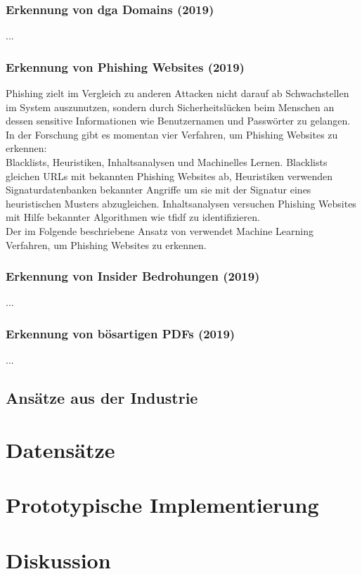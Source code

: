 \documentclass[
    12pt, %
    DIV10,
    ngerman, %
    a4paper, %
    oneside, %
    titlepage, %
    parskip=half, %
    headings=normal, %
    listof=totoc, %
    bibliography=totoc, %
    index=totoc, %
    captions=tableheading, %
    final %
]{scrreprt}
\begin{document}
\subsection{Erkennung von \ac{dga} Domains (2019)}
\textcite{Li2019}...
%
\subsection{Erkennung von Phishing Websites (2019)}
Phishing zielt im Vergleich zu anderen Attacken nicht darauf ab Schwachstellen im System auszunutzen, sondern durch Sicherheitslücken beim Menschen an dessen sensitive Informationen wie Benutzernamen und Passwörter zu gelangen.
In der Forschung gibt es momentan vier Verfahren, um Phishing Websites zu erkennen:\\
Blacklists, Heuristiken, Inhaltsanalysen und Machinelles Lernen. Blacklists gleichen URLs mit bekannten Phishing Websites ab, Heuristiken verwenden Signaturdatenbanken bekannter Angriffe um sie mit der Signatur eines heuristischen Musters abzugleichen. Inhaltsanalysen versuchen Phishing Websites mit Hilfe bekannter Algorithmen wie \ac{tfidf} zu identifizieren. \\
Der im Folgende beschriebene Ansatz von \textcite{Alswailem2019} verwendet Machine Learning Verfahren, um Phishing Websites zu erkennen.
%
\subsection{Erkennung von Insider Bedrohungen (2019)}
\textcite{Le2019}...
%
\subsection{Erkennung von bösartigen PDFs (2019)}
\textcite{Jeong2019}...
%
\section{Ansätze aus der Industrie}\label{sec:ai}
\textcite{Microsoft2019}
\chapter{Datensätze}
\chapter{Prototypische Implementierung}
\chapter{Diskussion}
\end{document}
